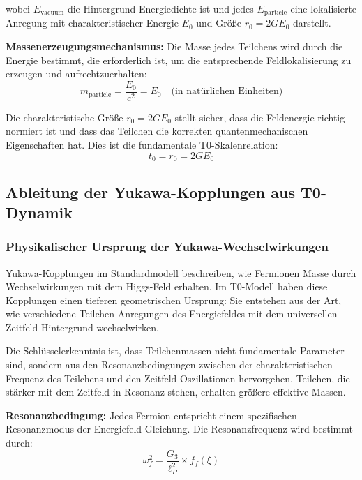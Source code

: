 \documentclass[12pt,a4paper]{article}
\newcommand{\Tzero}{t_0}
\newcommand{\xigeom}{\xi}
\begin{document}
	wobei $E_{\text{vacuum}}$ die Hintergrund-Energiedichte ist und jedes $E_{\text{particle}}$ eine lokalisierte Anregung mit charakteristischer Energie $E_0$ und Größe $r_0 = 2GE_0$ darstellt.
	
	\textbf{Massenerzeugungsmechanismus:} Die Masse jedes Teilchens wird durch die Energie bestimmt, die erforderlich ist, um die entsprechende Feldlokalisierung zu erzeugen und aufrechtzuerhalten:
	\begin{equation}
		m_{\text{particle}} = \frac{E_0}{c^2} = E_0 \quad \text{(in natürlichen Einheiten)}
	\end{equation}
	
	Die charakteristische Größe $r_0 = 2GE_0$ stellt sicher, dass die Feldenergie richtig normiert ist und dass das Teilchen die korrekten quantenmechanischen Eigenschaften hat. Dies ist die fundamentale T0-Skalenrelation:
	\begin{equation}
		\Tzero = r_0 = 2GE_0
	\end{equation}
	
	\subsection{Ableitung der Yukawa-Kopplungen aus T0-Dynamik}
	
	\subsubsection{Physikalischer Ursprung der Yukawa-Wechselwirkungen}
	
	Yukawa-Kopplungen im Standardmodell beschreiben, wie Fermionen Masse durch Wechselwirkungen mit dem Higgs-Feld erhalten. Im T0-Modell haben diese Kopplungen einen tieferen geometrischen Ursprung: Sie entstehen aus der Art, wie verschiedene Teilchen-Anregungen des Energiefeldes mit dem universellen Zeitfeld-Hintergrund wechselwirken.
	
	Die Schlüsselerkenntnis ist, dass Teilchenmassen nicht fundamentale Parameter sind, sondern aus den Resonanzbedingungen zwischen der charakteristischen Frequenz des Teilchens und den Zeitfeld-Oszillationen hervorgehen. Teilchen, die stärker mit dem Zeitfeld in Resonanz stehen, erhalten größere effektive Massen.
	
	\textbf{Resonanzbedingung:} Jedes Fermion entspricht einem spezifischen Resonanzmodus der Energiefeld-Gleichung. Die Resonanzfrequenz wird bestimmt durch:
	\begin{equation}
		\omega_f^2 = \frac{G_3}{\ell_P^2} \times f_f(\xigeom)
	\end{equation}
	
\end{document}
